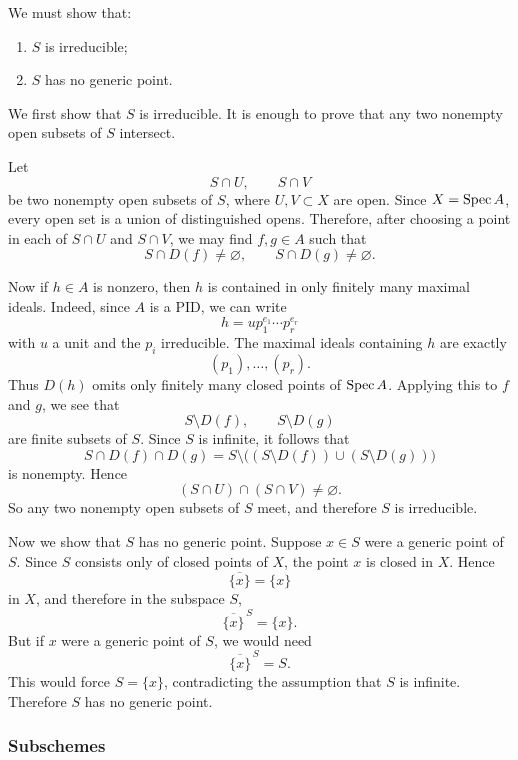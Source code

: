 \documentclass[12pt]{article}
\begin{document}
\begin{solution}
    We must show that:
    \begin{enumerate}
        \item \(S\) is irreducible;
        \item \(S\) has no generic point.
    \end{enumerate}

    We first show that \(S\) is irreducible. It is enough to prove that any two nonempty open subsets of \(S\) intersect.

    Let
    \[
        S\cap U,\qquad S\cap V
    \]
    be two nonempty open subsets of \(S\), where \(U,V\subset X\) are open. Since \(X=\operatorname{Spec} A\), every open set is a union of distinguished opens. Therefore, after choosing a point in each of \(S\cap U\) and \(S\cap V\), we may find \(f,g\in A\) such that
    \[
        S\cap D(f)\neq \varnothing,\qquad S\cap D(g)\neq \varnothing.
    \]

    Now if \(h\in A\) is nonzero, then \(h\) is contained in only finitely many maximal ideals. Indeed, since \(A\) is a PID, we can write
    \[
        h=u p_1^{e_1}\cdots p_r^{e_r}
    \]
    with \(u\) a unit and the \(p_i\) irreducible. The maximal ideals containing \(h\) are exactly
    \[
        (p_1),\dots,(p_r).
    \]
    Thus \(D(h)\) omits only finitely many closed points of \(\operatorname{Spec} A\). Applying this to \(f\) and \(g\), we see that
    \[
        S\setminus D(f),\qquad S\setminus D(g)
    \]
    are finite subsets of \(S\). Since \(S\) is infinite, it follows that
    \[
        S\cap D(f)\cap D(g)
        =
        S\setminus\bigl((S\setminus D(f))\cup (S\setminus D(g))\bigr)
    \]
    is nonempty. Hence
    \[
        (S\cap U)\cap (S\cap V)\neq \varnothing.
    \]
    So any two nonempty open subsets of \(S\) meet, and therefore \(S\) is irreducible.

    Now we show that \(S\) has no generic point. Suppose \(x\in S\) were a generic point of \(S\). Since \(S\) consists only of closed points of \(X\), the point \(x\) is closed in \(X\). Hence
    \[
        \overline{\{x\}}=\{x\}
    \]
    in \(X\), and therefore in the subspace \(S\),
    \[
        \overline{\{x\}}^{\,S}=\{x\}.
    \]
    But if \(x\) were a generic point of \(S\), we would need
    \[
        \overline{\{x\}}^{\,S}=S.
    \]
    This would force \(S=\{x\}\), contradicting the assumption that \(S\) is infinite. Therefore \(S\) has no generic point.
\end{solution}

\subsubsection{Subschemes}
\end{document}
